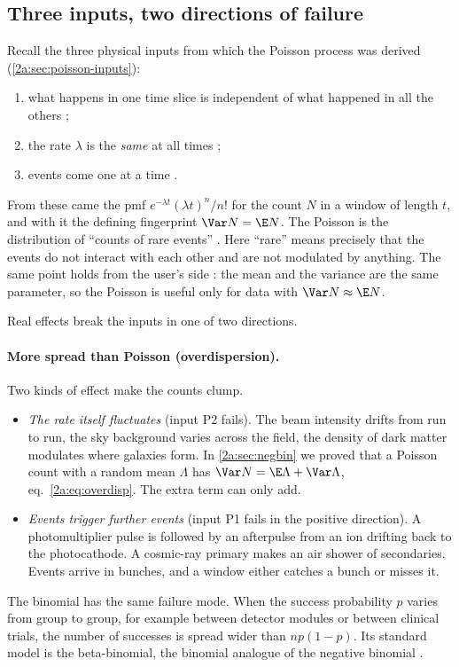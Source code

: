 \subsection{Three inputs, two directions of failure}

Recall the three physical inputs from which the Poisson process was derived (\cref{2a:sec:poisson-inputs}):
\begin{enumerate}[leftmargin=2.6em,itemsep=1pt,label=(P\arabic*)]
  \item what happens in one time slice is independent of what happened in all the others ;
  \item the rate $\lambda$ is the \emph{same} at all times ;
  \item events come one at a time .
\end{enumerate}
From these came the pmf $e^{-\lambda t}(\lambda t)^n/n!$ for the count $N$ in a window of length $t$, and with it the defining fingerprint $\Var N=\E N$. The Poisson is the distribution of ``counts of rare events'' . Here ``rare'' means precisely that the events do not interact with each other and are not modulated by anything. The same point holds from the user's side : the mean and the variance are the same parameter, so the Poisson is useful only for data with $\Var N\approx\E N$.

Real effects break the inputs in one of two directions.

\paragraph{More spread than Poisson (overdispersion).} Two kinds of effect make the counts clump.
\begin{itemize}[leftmargin=1.4em,itemsep=1pt]
  \item \emph{The rate itself fluctuates} (input P2 fails). The beam intensity drifts from run to run, the sky background varies across the field, the density of dark matter modulates where galaxies form. In \cref{2a:sec:negbin} we proved that a Poisson count with a random mean $\Lambda$ has $\Var N=\E\Lambda+\Var\Lambda$, eq.~\eqref{2a:eq:overdisp}. The extra term can only add.
  \item \emph{Events trigger further events} (input P1 fails in the positive direction). A photomultiplier pulse is followed by an afterpulse from an ion drifting back to the photocathode. A cosmic-ray primary makes an air shower of secondaries. Events arrive in bunches, and a window either catches a bunch or misses it.
\end{itemize}
The binomial has the same failure mode. When the success probability $p$ varies from group to group, for example between detector modules or between clinical trials, the number of successes is spread wider than $np(1-p)$. Its standard model is the beta-binomial, the binomial analogue of the negative binomial .

